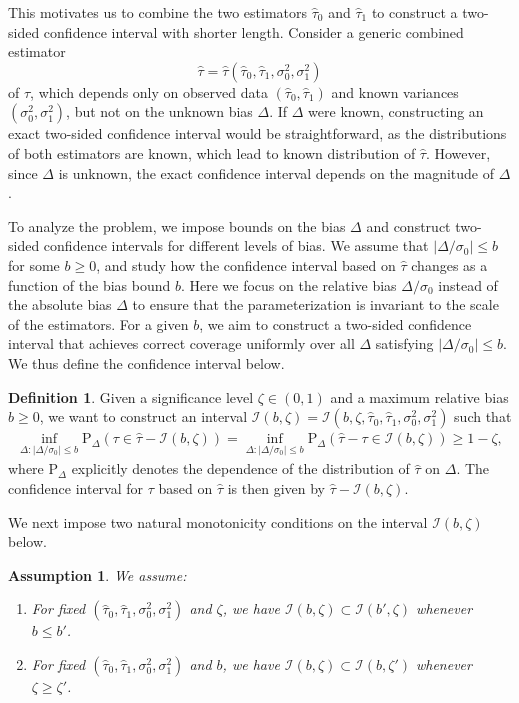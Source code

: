 \documentclass[11pt]{article}
\def\P{{\mathrm P}}
\def\cI{{\mathcal I}}
\newcommand{\htau}{\widehat\tau}
\numberwithin{equation}{section}
\newtheorem{assumption}{Assumption}[section]
\theoremstyle{definition}
\newtheorem{definition}{Definition}[section]
\begin{document}
This motivates us to combine the two estimators $\htau_0$ and $\htau_1$ to construct a two-sided confidence interval with shorter length. Consider a generic combined estimator 
\[
\hat\tau = \hat\tau(\htau_0, \htau_1, \sigma_0^2, \sigma_1^2)
\]
of $\tau$, which depends only on observed data $(\htau_0, \htau_1)$ and known variances $(\sigma_0^2, \sigma_1^2)$, but not on the unknown bias $\Delta$. If $\Delta$ were known, constructing an exact two-sided confidence interval would be straightforward, as the distributions of both estimators are known, which lead to known distribution of $\hat\tau$. However, since $\Delta$ is unknown, the exact confidence interval depends on the magnitude of $\Delta$.

To analyze the problem, we impose bounds on the bias $\Delta$ and construct two-sided confidence intervals for different levels of bias. We assume that $\lvert \Delta/\sigma_0 \rvert \le b$ for some $b \ge 0$, and study how the confidence interval based on $\hat\tau$ changes as a function of the bias bound $b$. Here we focus on the relative bias $\Delta/\sigma_0$ instead of the absolute bias $\Delta$ to ensure that the parameterization is invariant to the scale of the estimators. For a given $b$, we aim to construct a two-sided confidence interval that achieves correct coverage uniformly over all $\Delta$ satisfying $\lvert \Delta/\sigma_0\rvert \le b$. We thus define the confidence interval below.
\begin{definition}\label{def:CI}
  Given a significance level $\zeta \in (0,1)$ and a maximum relative bias $b \ge 0$, we want to construct an interval $\cI(b, \zeta) = \cI(b, \zeta, \htau_0, \htau_1, \sigma_0^2, \sigma_1^2)$ such that
  \begin{align}\label{eq:coverage}
    \inf_{\Delta: \lvert \Delta/\sigma_0 \rvert \le b} \P_\Delta(\tau \in \hat\tau - \cI(b, \zeta)) 
    = \inf_{\Delta: \lvert \Delta/\sigma_0  \rvert \le b} \P_\Delta(\hat\tau - \tau \in \cI(b, \zeta)) \ge 1 - \zeta,
  \end{align}
  where $\P_\Delta$ explicitly denotes the dependence of the distribution of $\hat\tau$ on $\Delta$. The confidence interval for $\tau$ based on $\hat\tau$ is then given by $\hat\tau - \cI(b, \zeta)$.
\end{definition}


We next impose two natural monotonicity conditions on the interval $\cI(b, \zeta)$ below.
\begin{assumption}\label{asp:monotonicity}
We assume:
\begin{enumerate}
  \item For fixed $(\htau_0, \htau_1, \sigma_0^2, \sigma_1^2)$ and $\zeta$, we have $\cI(b, \zeta) \subset \cI(b', \zeta)$ whenever $b \le b'$.
  \item For fixed $(\htau_0, \htau_1, \sigma_0^2, \sigma_1^2)$ and $b$, we have $\cI(b, \zeta) \subset \cI(b, \zeta')$ whenever $\zeta \ge \zeta'$.
\end{enumerate}
\end{assumption}
\end{document}
